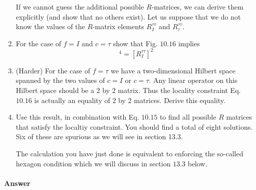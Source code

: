 \documentclass{book}
\begin{document}
\begin{enumerate}
If we cannot guess the additional possible $R$-matrices, we can derive them explicitly (and show that no others exist). Let us suppose that we do not know the values of the $R$-matrix elements $R_{I}^{\tau \tau }$ and $R_{\tau }^{\tau \tau }$.
\item For the case of $f=I$ and $c=\tau $ show that Fig. $10.16$ implies\begin{equation*}
[R_{\tau }^{\tau \tau } ]^{4} =[R_{I}^{\tau \tau } ]^{2}
\end{equation*}
\item (Harder) For the case of $f=\tau $ we have a two-dimensional Hilbert space spanned by the two values of $c=I$ or $c=\tau $. Any linear operator on this Hilbert space should be a 2 by 2 matrix. Thus the locality constraint Eq. $10.16$ is actually an equality of 2 by 2 matrices. Derive this equality.
\item Use this result, in combination with Eq. $10.15$ to find all possible $R$ matrices that satisfy the localtiy constraint. You should find a total of eight solutions. Six of these are spurious as we will see in section 13.3.

The calculation you have just done is equivalent to enforcing the so-called hexagon condition which we will discuss in section $13.3$ below.
\end{enumerate}

\paragraph{Answer}




\end{document}
